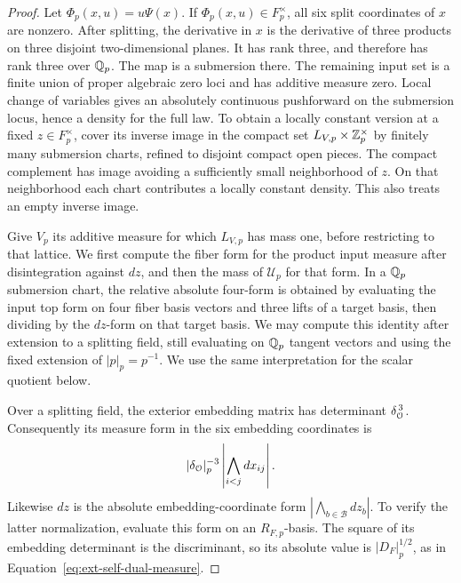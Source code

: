 \begin{proof}
Let \(\Phi_p(x,u)=u\Psi(x)\).  If \(\Phi_p(x,u)\in F_p^\times\), all six
split coordinates of \(x\) are nonzero.  After splitting, the derivative
in \(x\) is the derivative of three products on three disjoint
two-dimensional planes.  It has rank three, and therefore has rank
three over \(\mathbb Q_p\).  The map is a submersion there.  The remaining
input set is a finite union of proper algebraic zero loci and has
additive measure zero.  Local change of variables gives an absolutely
continuous pushforward on the submersion locus, hence a density for
the full law.  To obtain a locally constant version at a fixed
\(z\in F_p^\times\), cover its inverse image in the compact set
\(L_{V,p}\times\mathbb Z_p^\times\) by finitely many submersion charts,
refined to disjoint compact open pieces.  The compact complement has
image avoiding a sufficiently small neighborhood of \(z\).
On that neighborhood each chart contributes a locally constant
density.  This also treats an empty inverse image.

Give \(V_p\) its additive measure for which \(L_{V,p}\) has mass one,
before restricting to that lattice.  We first compute the fiber form for
the product input measure after disintegration against \(dz\), and then
the mass of \(\mathscr U_p\) for that form.  In a \(\mathbb Q_p\) submersion chart,
the relative absolute four-form is obtained by evaluating the input top
form on four fiber basis vectors and three lifts of a target basis, then
dividing by the \(dz\)-form on that target basis.  We may compute this
identity after extension to a splitting field, still evaluating on \(\mathbb Q_p\) tangent
vectors and using the fixed extension of \(|p|_p=p^{-1}\).  We use the
same interpretation for the scalar quotient below.

Over a splitting field, the exterior embedding matrix has determinant
\(\delta_{\mathcal O}^{\,3}\).  Consequently its measure form in the six
embedding coordinates is
\[
 |\delta_{\mathcal O}|_p^{-3}\left|\bigwedge_{i<j}dx_{ij}\right|.
\]
Likewise \(dz\) is the absolute embedding-coordinate form
\(\left|\bigwedge_{b\in\mathcal B}dz_b\right|\).  To verify the latter
normalization, evaluate this form on an \(R_{F,p}\)-basis.  The square
of its embedding determinant is the discriminant, so its absolute
value is \(|D_F|_p^{1/2}\), as in
Equation~\eqref{eq:ext-self-dual-measure}.


\end{proof}
